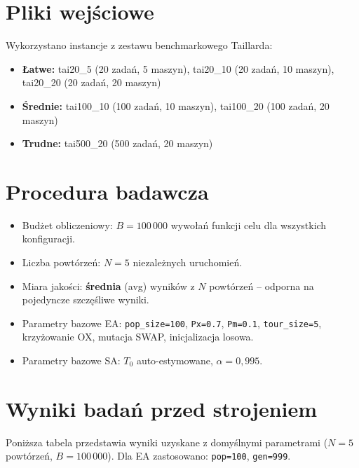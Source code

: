\documentclass[11pt,a4paper]{article}
\begin{document}
\section{Pliki wejściowe}
Wykorzystano instancje z zestawu benchmarkowego Taillarda:
\begin{itemize}
    \item \textbf{Łatwe:} tai20\_5 (20 zadań, 5 maszyn), tai20\_10 (20 zadań, 10 maszyn), tai20\_20 (20 zadań, 20 maszyn)
    \item \textbf{Średnie:} tai100\_10 (100 zadań, 10 maszyn), tai100\_20 (100 zadań, 20 maszyn)
    \item \textbf{Trudne:} tai500\_20 (500 zadań, 20 maszyn)
\end{itemize}

\section{Procedura badawcza}
\begin{itemize}
    \item Budżet obliczeniowy: $B = 100\,000$ wywołań funkcji celu dla wszystkich konfiguracji.
    \item Liczba powtórzeń: $N = 5$ niezależnych uruchomień.
    \item Miara jakości: \textbf{średnia} (avg) wyników z $N$ powtórzeń -- odporna na pojedyncze szczęśliwe wyniki.
    \item Parametry bazowe EA: \texttt{pop\_size=100}, \texttt{Px=0.7}, \texttt{Pm=0.1}, \texttt{tour\_size=5}, krzyżowanie OX, mutacja SWAP, inicjalizacja losowa.
    \item Parametry bazowe SA: $T_0$ auto-estymowane, $\alpha=0{,}995$.
\end{itemize}

\section{Wyniki badań przed strojeniem}
\label{sec:baseline}

Poniższa tabela przedstawia wyniki uzyskane z domyślnymi parametrami ($N=5$ powtórzeń, $B=100\,000$). Dla EA zastosowano: \texttt{pop=100}, \texttt{gen=999}.
\end{document}
